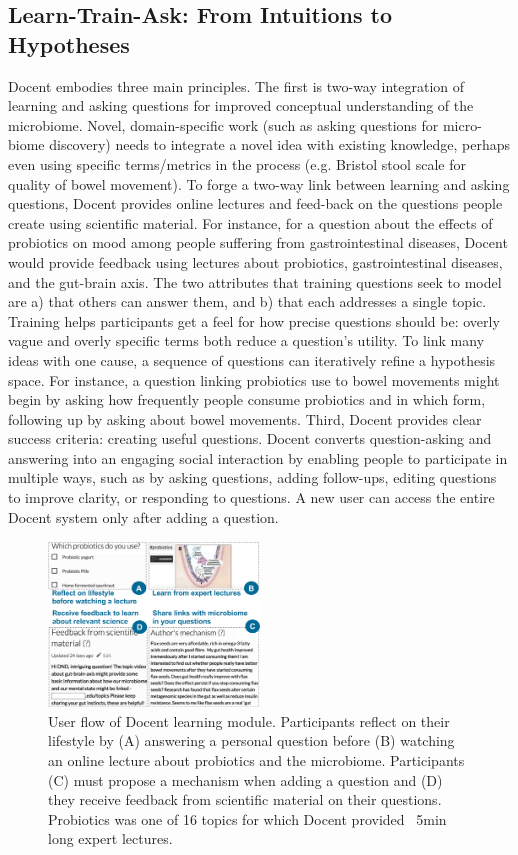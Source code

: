 \subsection{Learn-Train-Ask: From Intuitions to Hypotheses}
Docent embodies three main principles. The first is two-way integration of learning and asking questions for improved conceptual understanding of the microbiome. Novel, domain-specific work (such as asking questions for micro-biome discovery) needs to integrate a novel idea with existing knowledge, perhaps even using specific terms/metrics in the process (e.g. Bristol stool scale for quality of bowel movement). To forge a two-way link between learning and asking questions, Docent provides online lectures and feed-back on the questions people create using scientific material. For instance, for a question about the effects of probiotics on mood among people suffering from gastrointestinal diseases, Docent would provide feedback using lectures about probiotics, gastrointestinal diseases, and the gut-brain axis.
The two attributes that training questions seek to model are a) that others can answer them, and b) that each addresses a single topic. Training helps participants get a feel for how precise questions should be: overly vague and overly specific terms both reduce a question’s utility. To link many ideas with one cause, a sequence of questions can iteratively refine a hypothesis space. For instance, a question linking probiotics use to bowel movements might begin by asking how frequently people consume probiotics and in which form, following up by asking about bowel movements.
Third, Docent provides clear success criteria: creating useful questions. Docent converts question-asking and answering into an engaging social interaction by enabling people to participate in multiple ways, such as by asking questions, adding follow-ups, editing questions to improve clarity, or responding to questions. A new user can access the entire Docent system only after adding a question.

\begin{figure}
  \centering
  \includegraphics[width=0.5\textwidth]{figures/docent/fig-2.png}
  \caption[User flow of Docent learning module]
{User flow of Docent learning module. Participants reflect on their lifestyle by (A) answering a personal question before (B) watching an online lecture about probiotics and the microbiome. Participants (C) must propose a mechanism when adding a question and (D) they receive feedback from scientific material on their questions. Probiotics was one of 16 topics for which Docent provided ~5min long expert lectures.}
  \label{fig:docent-2}
\end{figure}
 
